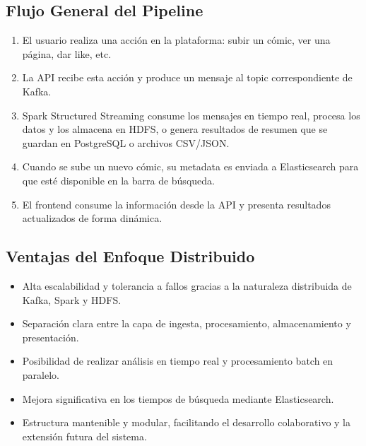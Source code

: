 \subsection*{Flujo General del Pipeline}

\begin{enumerate}
    \item El usuario realiza una acción en la plataforma: subir un cómic, ver una página, dar like, etc.
    \item La API recibe esta acción y produce un mensaje al topic correspondiente de Kafka.
    \item Spark Structured Streaming consume los mensajes en tiempo real, procesa los datos y los almacena en HDFS, o genera resultados de resumen que se guardan en PostgreSQL o archivos CSV/JSON.
    \item Cuando se sube un nuevo cómic, su metadata es enviada a Elasticsearch para que esté disponible en la barra de búsqueda.
    \item El frontend consume la información desde la API y presenta resultados actualizados de forma dinámica.
\end{enumerate}

\subsection*{Ventajas del Enfoque Distribuido}

\begin{itemize}
    \item Alta escalabilidad y tolerancia a fallos gracias a la naturaleza distribuida de Kafka, Spark y HDFS.
    \item Separación clara entre la capa de ingesta, procesamiento, almacenamiento y presentación.
    \item Posibilidad de realizar análisis en tiempo real y procesamiento batch en paralelo.
    \item Mejora significativa en los tiempos de búsqueda mediante Elasticsearch.
    \item Estructura mantenible y modular, facilitando el desarrollo colaborativo y la extensión futura del sistema.
\end{itemize}

